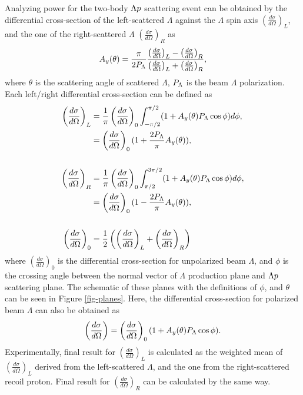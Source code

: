 Analyzing power for the two-body $\Lambda p$ scattering event can be obtained by the differential cross-section of the left-scattered $\Lambda$ against the $\Lambda$ spin axis $\left( \frac{d\sigma}{d\Omega} \right)_{L}$, and the one of the right-scattered $\Lambda$ $\left( \frac{d\sigma}{d\Omega} \right)_{R}$ as
\begin{equation}
  A_{y}(\theta) = \frac{\pi}{2P_{\Lambda}} \frac{\left( \frac{d\sigma}{d\Omega} \right)_{L} - \left( \frac{d\sigma}{d\Omega} \right)_{R}}{\left( \frac{d\sigma}{d\Omega} \right)_{L} + \left( \frac{d\sigma}{d\Omega} \right)_{R}},
  \label{eq-anapow}
\end{equation}
where $\theta$ is the scattering angle of scattered $\Lambda$, $P_{\Lambda}$ is the beam $\Lambda$ polarization. Each left/right differential cross-section can be defined as 
\begin{align}
  \left( \frac{d\sigma}{d\Omega} \right)_{L} &= \frac{1}{\pi} \left( \frac{d\sigma}{d\Omega} \right)_{0} \int^{\pi/2}_{-\pi/2} (1+A_{y}(\theta)P_{\Lambda}\cos{\phi})d\phi, \\
  &= \left( \frac{d\sigma}{d\Omega} \right)_{0} (1+\frac{2P_{\Lambda}}{\pi}A_{y}(\theta)), \\
  & \nonumber \\
   \left( \frac{d\sigma}{d\Omega} \right)_{R} &= \frac{1}{\pi} \left( \frac{d\sigma}{d\Omega} \right)_{0} \int^{3\pi/2}_{\pi/2} (1+A_{y}(\theta)P_{\Lambda}\cos{\phi})d\phi, \\
  &= \left( \frac{d\sigma}{d\Omega} \right)_{0} (1-\frac{2P_{\Lambda}}{\pi}A_{y}(\theta)), \\
  & \nonumber \\
  \left( \frac{d\sigma}{d\Omega} \right)_{0} &= \frac{1}{2} \left(\left( \frac{d\sigma}{d\Omega} \right)_{L} + \left( \frac{d\sigma}{d\Omega} \right)_{R} \right)
\end{align}
where $\left( \frac{d\sigma}{d\Omega} \right)_{0}$ is the differential cross-section for unpolarized beam $\Lambda$, and $\phi$ is the crossing angle between the normal vector of $\Lambda$ production plane and $\Lambda p$ scattering plane. The schematic of these planes with the definitions of $\phi$, and $\theta$ can be seen in Figure \ref{fig-planes}. Here, the differential cross-section for polarized beam $\Lambda$ can also be obtained as 
\begin{equation}
  \left( \frac{d\sigma}{d\Omega} \right) = \left( \frac{d\sigma}{d\Omega} \right)_{0} (1+A_{y}(\theta)P_{\Lambda}\cos{\phi}).
  \label{eq-dcs_theo}
\end{equation}
Experimentally, final result for $\left( \frac{d\sigma}{d\Omega} \right)_{L}$ is calculated as the weighted mean of $ \left( \frac{d\sigma}{d\Omega} \right)_{L}$ derived from the left-scattered $\Lambda$, and the one from the right-scattered recoil proton. Final result for $\left( \frac{d\sigma}{d\Omega} \right)_{R}$ can be calculated by the same way. 

